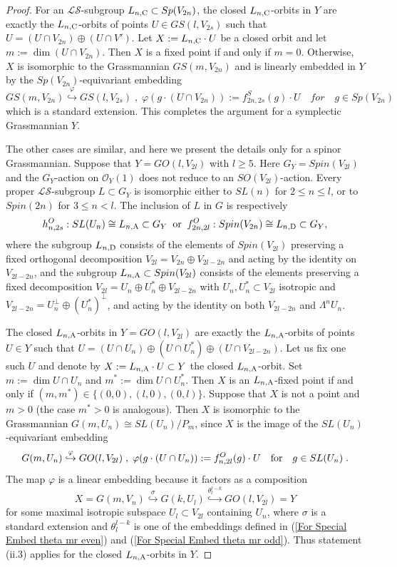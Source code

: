 \documentclass[12pt]{amsart}
\def\hw  {\hookrightarrow}
\def\mc {\mathcal}
\begin{document}
\begin{proof}
For an $\mc{LS}$-subgroup $L_{n,{\rm C}}\subset Sp(V_{2n})$, the closed $L_{n,{\rm C}}$-orbits in $Y$ are exactly the $L_{n,{\rm C}}$-orbits of points $U\in GS(l,V_{2s})$ such that $U=(U\cap V_{2n})\oplus (U\cap V')$. Let $X:=L_{n,{\rm C}}\cdot U$ be a closed orbit and let $m:=\dim(U\cap V_{2n})$. Then $X$ is a fixed point if and only if $m=0$. Otherwise, $X$ is isomorphic to the Grassmannian $GS(m,V_{2n})$ and is linearly embedded in $Y$ by the $Sp(V_{2n})$-equivariant embedding
$$
GS(m,V_{2n}) \stackrel{\varphi}{\hookrightarrow} GS(l,V_{2s}) \;,\; \varphi(g\cdot (U\cap V_{2n})) := f^S_{2n,2s}(g)\cdot U \quad for\quad g\in Sp(V_{2n})
$$
which is a standard extension. This completes the argument for a symplectic Grassmannian $Y$.

The other cases are similar, and here we present the details only for a spinor Grassmannian. Suppose that $Y=GO(l,V_{2l})$ with $l\geq 5$. Here $G_Y=Spin(V_{2l})$ and the $G_Y$-action on $\mc O_Y(1)$ does not reduce to an $SO(V_{2l})$-action. Every proper $\mc{LS}$-subgroup $L\subset G_Y$ is isomorphic either to $SL(n)$ for $2\leq n\leq l$, or to $Spin(2n)$ for $3\leq n< l$. The inclusion of $L$ in $G$ is respectively
$$
h^O_{n,2s}:SL(U_n)\cong L_{n,{\rm A}} \subset G_Y \;\;{\rm or}\;\; f^O_{2n,2l}:Spin(V_{2n})\cong L_{n,{\rm D}}\subset G_Y ,
$$
where the subgroup $L_{n,{\rm D}}$ consists of the elements of $Spin(V_{2l})$ preserving a fixed orthogonal decomposition $V_{2l}=V_{2n}\oplus V_{2l-2n}$ and acting by the identity on $V_{2l-2n}$, and the subgroup $L_{n,{\rm A}}\subset Spin(V_{2l})$ consists of the elements preserving a fixed decomposition $V_{2l}=U_{n}\oplus U_n^*\oplus V_{2l-2n}$ with $U_{n},U_n^*\subset V_{2l}$ isotropic and $V_{2l-2n}=U_n^\perp\oplus (U_n^*)^\perp$, and acting by the identity on both $V_{2l-2n}$ and $\Lambda^n U_n$.

The closed $L_{n,{\rm A}}$-orbits in $Y=GO(l,V_{2l})$ are exactly the $L_{n,{\rm A}}$-orbits of points $U\in Y$ such that $U=(U\cap U_n)\oplus (U\cap U_n^*)\oplus (U\cap V_{2l-2n})$. Let us fix one such $U$ and denote by $X:=L_{n,{\rm A}}\cdot U\subset Y$ the closed $L_{n,{\rm A}}$-orbit. Set $m:=\dim U\cap U_n$ and $m^*:=\dim U\cap U_n^*$. Then $X$ is an $L_{n,{\rm A}}$-fixed point if and only if $(m,m^*)\in\{(0,0),(l,0),(0,l)\}$. Suppose that $X$ is not a point and $m>0$ (the case $m^*>0$ is analogous). Then $X$ is isomorphic to the Grassmannian $G(m,U_n)\cong SL(U_n)/P_m$, since $X$ is the image of the $SL(U_n)$-equivariant embedding
$$
G(m,U_n) \stackrel{\varphi}{\hookrightarrow} GO(l,V_{2l}) \;,\; \varphi(g\cdot (U\cap U_n)) := f^O_{n,2l}(g)\cdot U \quad {\rm for}\quad g\in SL(U_n) \;.
$$
The map $\varphi$ is a linear embedding because it factors as a composition
$$
X=G(m,V_n)\stackrel{\sigma}{\hw} G(k,U_l) \stackrel{\theta_l^{l-k}}{\hw} GO(l,V_{2l})=Y
$$
for some maximal isotropic subspace $U_l\subset V_{2l}$ containing $U_n$, where $\sigma$ is a standard extension and $\theta_l^{l-k}$ is one of the embeddings defined in (\ref{For Special Embed theta mr even}) and (\ref{For Special Embed theta mr odd}). Thus statement (ii.3) applies for the closed $L_{n,{\rm A}}$-orbits in $Y$.


\end{proof}
\end{document}
